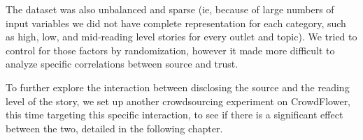 The dataset was also unbalanced and sparse (ie, because of large numbers of input variables we did not have complete representation for each category, such as high, low, and mid-reading level stories for every outlet and topic). We tried to control for those factors by randomization, however it made more difficult to analyze specific correlations between source and trust.

To further explore the interaction between disclosing the source and the reading level of the story, we set up another crowdsourcing experiment on CrowdFlower, this time targeting this specific interaction, to see if there is a significant effect between the two, detailed in the following chapter.

%  